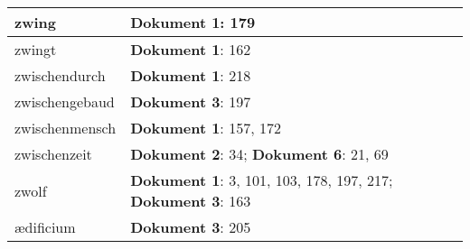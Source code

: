 \documentclass[a5paper]{article}
\begin{document}
\begin{longtable}[l]{|l|p{3in}|}
\hline
zwing & \textbf{Dokument 1}: 179 \\
\hline
zwingt & \textbf{Dokument 1}: 162 \\
\hline
zwischendurch & \textbf{Dokument 1}: 218 \\
\hline
zwischengebaud & \textbf{Dokument 3}: 197 \\
\hline
zwischenmensch & \textbf{Dokument 1}: 157, 172 \\
\hline
zwischenzeit & \textbf{Dokument 2}: 34; \textbf{Dokument 6}: 21, 69 \\
\hline
zwolf & \textbf{Dokument 1}: 3, 101, 103, 178, 197, 217; \textbf{Dokument 3}: 163 \\
\hline
ædificium & \textbf{Dokument 3}: 205 \\
\hline
\end{longtable}
\end{document}
